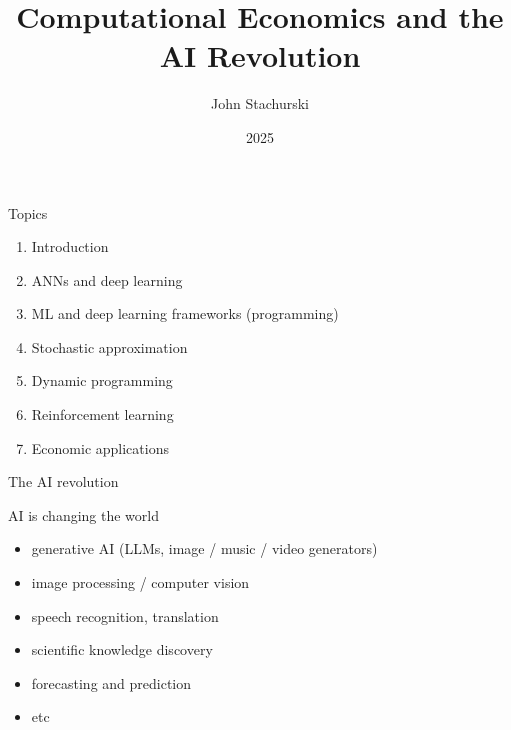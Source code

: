 


\title{Computational Economics and the AI Revolution}



\author{John Stachurski}


\date{2025}




\begin{frame}
  \titlepage
\end{frame}



\begin{frame}{Topics}

    \begin{enumerate}
        \item Introduction
        \vspace{0.5em}
        \item ANNs and deep learning
        \vspace{0.5em}
        \item ML and deep learning frameworks (programming)
        \vspace{0.5em}
        \item Stochastic approximation
        \vspace{0.5em}
        \item Dynamic programming
        \vspace{0.5em}
        \item Reinforcement learning
        \vspace{0.5em}
        \item Economic applications
    \end{enumerate}

\end{frame}



\begin{frame}{The AI revolution}

    AI is changing the world

    \begin{itemize}
        \item generative AI  (LLMs, image / music / video generators)
        \vspace{0.5em}
        \item image processing / computer vision
        \vspace{0.5em}
        \item speech recognition, translation
        \vspace{0.5em}
        \item scientific knowledge discovery
        \vspace{0.5em}
        \item forecasting and prediction 
        \vspace{0.5em}
        \item etc
    \end{itemize}

    
\end{frame}


